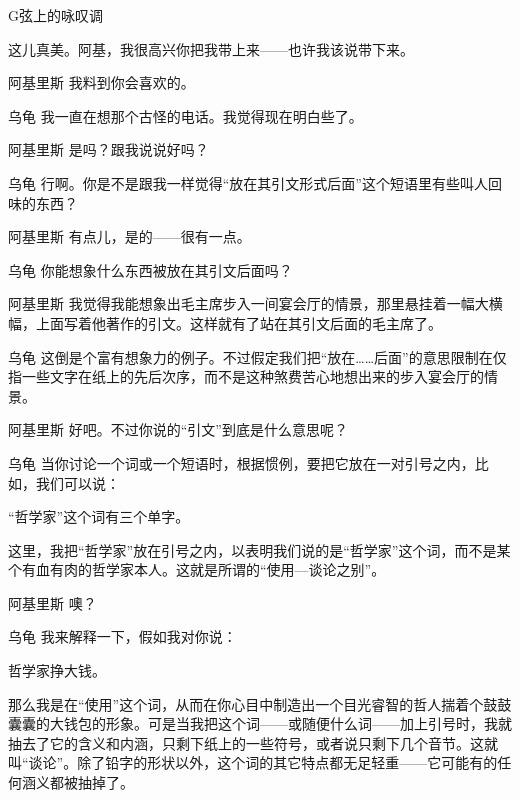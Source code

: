 \begin{dialog}{G弦上的咏叹调}
\begin{dialogue}

这儿真美。阿基，我很高兴你把我带上来——也许我该说带下来。

\item[阿基里斯]我料到你会喜欢的。

\item[乌龟]我一直在想那个古怪的电话。我觉得现在明白些了。

\item[阿基里斯]是吗？跟我说说好吗？

\item[乌龟]行啊。你是不是跟我一样觉得“放在其引文形式后面”这个短语里有些叫人回味的东西？

\item[阿基里斯]有点儿，是的——很有一点。

\item[乌龟]你能想象什么东西被放在其引文后面吗？

\item[阿基里斯]我觉得我能想象出毛主席步入一间宴会厅的情景，那里悬挂着一幅大横幅，上面写着他著作的引文。这样就有了站在其引文后面的毛主席了。

\item[乌龟]这倒是个富有想象力的例子。不过假定我们把“放在……后面”的意思限制在仅指一些文字在纸上的先后次序，而不是这种煞费苦心地想出来的步入宴会厅的情景。

\item[阿基里斯]好吧。不过你说的“引文”到底是什么意思呢？

\item[乌龟]当你讨论一个词或一个短语时，根据惯例，要把它放在一对引号之内，比如，我们可以说：
\begin{block}
“哲学家”这个词有三个单字。
\end{block}
这里，我把“哲学家”放在引号之内，以表明我们说的是“哲学家”这个词，而不是某个有血有肉的哲学家本人。这就是所谓的“使用—谈论之别”。

\item[阿基里斯]噢？

\item[乌龟]我来解释一下，假如我对你说：
\begin{block}
哲学家挣大钱。
\end{block}
那么我是在“使用”这个词，从而在你心目中制造出一个目光睿智的哲人揣着个鼓鼓囊囊的大钱包的形象。可是当我把这个词——或随便什么词——加上引号时，我就抽去了它的含义和内涵，只剩下纸上的一些符号，或者说只剩下几个音节。这就叫“谈论”。除了铅字的形状以外，这个词的其它特点都无足轻重——它可能有的任何涵义都被抽掉了。


\end{dialogue}
\end{dialog}
